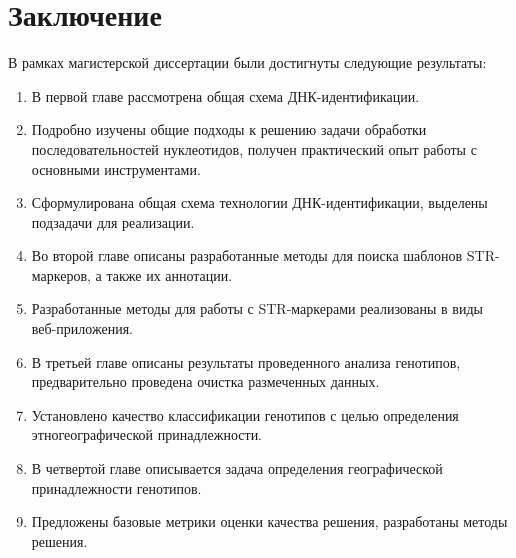 \chapter*{Заключение}


В рамках магистерской диссертации были достигнуты следующие результаты:
\begin{enumerate}
    \item В первой главе рассмотрена общая схема ДНК-идентификации.
    \item Подробно изучены общие подходы к решению задачи обработки последовательностей нуклеотидов, получен практический опыт работы с основными инструментами.
    \item Сформулирована общая схема технологии ДНК-идентификации, выделены подзадачи для реализации.
    \item Во второй главе описаны разработанные методы для поиска шаблонов STR-маркеров, а также их аннотации.
    \item Разработанные методы для работы с STR-маркерами реализованы в виды веб-приложения.
    \item В третьей главе описаны результаты проведенного анализа генотипов, предварительно проведена очистка размеченных данных.
    \item Установлено качество классификации генотипов с целью определения этногеографической принадлежности.
    \item В четвертой главе описывается задача определения географической принадлежности генотипов.
    \item Предложены базовые метрики оценки качества решения, разработаны методы решения.
\end{enumerate}
\clearpage

